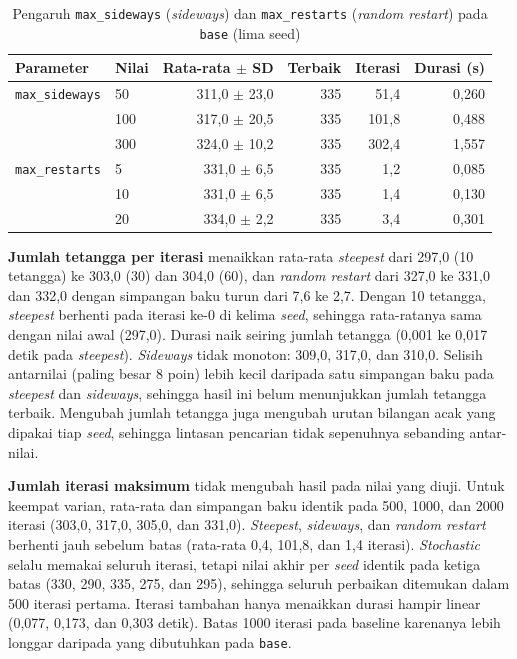 \begin{table}[H]
    \centering
    \small
    \caption{Pengaruh \texttt{max\_\allowbreak sideways} (\textit{sideways}) dan \texttt{max\_\allowbreak restarts} (\textit{random restart}) pada \texttt{base} (lima seed)}
    \label{tab:hc-sweep-lain}
    \begin{tabular}{@{}llrrrr@{}}
        \toprule
        Parameter                  & Nilai & Rata-rata $\pm$ SD & Terbaik & Iterasi & Durasi (s) \\
        \midrule
        \texttt{max\_\allowbreak sideways}     & 50    & 311,0 $\pm$ 23,0   & 335     & 51,4    & 0,260      \\
                                   & 100   & 317,0 $\pm$ 20,5   & 335     & 101,8   & 0,488      \\
                                   & 300   & 324,0 $\pm$ 10,2   & 335     & 302,4   & 1,557      \\
        \texttt{max\_\allowbreak restarts}     & 5     & 331,0 $\pm$ 6,5    & 335     & 1,2     & 0,085      \\
                                   & 10    & 331,0 $\pm$ 6,5    & 335     & 1,4     & 0,130      \\
                                   & 20    & 334,0 $\pm$ 2,2    & 335     & 3,4     & 0,301      \\
        \bottomrule
    \end{tabular}
\end{table}

\textbf{Jumlah tetangga per iterasi} menaikkan rata-rata \textit{steepest} dari 297,0 (10 tetangga) ke 303,0 (30) dan 304,0 (60), dan \textit{random restart} dari 327,0 ke 331,0 dan 332,0 dengan simpangan baku turun dari 7,6 ke 2,7. Dengan 10 tetangga, \textit{steepest} berhenti pada iterasi ke-0 di kelima \textit{seed}, sehingga rata-ratanya sama dengan nilai awal (297,0). Durasi naik seiring jumlah tetangga (0,001 ke 0,017 detik pada \textit{steepest}). \textit{Sideways} tidak monoton: 309,0, 317,0, dan 310,0. Selisih antarnilai (paling besar 8 poin) lebih kecil daripada satu simpangan baku pada \textit{steepest} dan \textit{sideways}, sehingga hasil ini belum menunjukkan jumlah tetangga terbaik. Mengubah jumlah tetangga juga mengubah urutan bilangan acak yang dipakai tiap \textit{seed}, sehingga lintasan pencarian tidak sepenuhnya sebanding antar-nilai.

\textbf{Jumlah iterasi maksimum} tidak mengubah hasil pada nilai yang diuji. Untuk keempat varian, rata-rata dan simpangan baku identik pada 500, 1000, dan 2000 iterasi (303,0, 317,0, 305,0, dan 331,0). \textit{Steepest}, \textit{sideways}, dan \textit{random restart} berhenti jauh sebelum batas (rata-rata 0,4, 101,8, dan 1,4 iterasi). \textit{Stochastic} selalu memakai seluruh iterasi, tetapi nilai akhir per \textit{seed} identik pada ketiga batas (330, 290, 335, 275, dan 295), sehingga seluruh perbaikan ditemukan dalam 500 iterasi pertama. Iterasi tambahan hanya menaikkan durasi hampir linear (0,077, 0,173, dan 0,303 detik). Batas 1000 iterasi pada baseline karenanya lebih longgar daripada yang dibutuhkan pada \texttt{base}.

